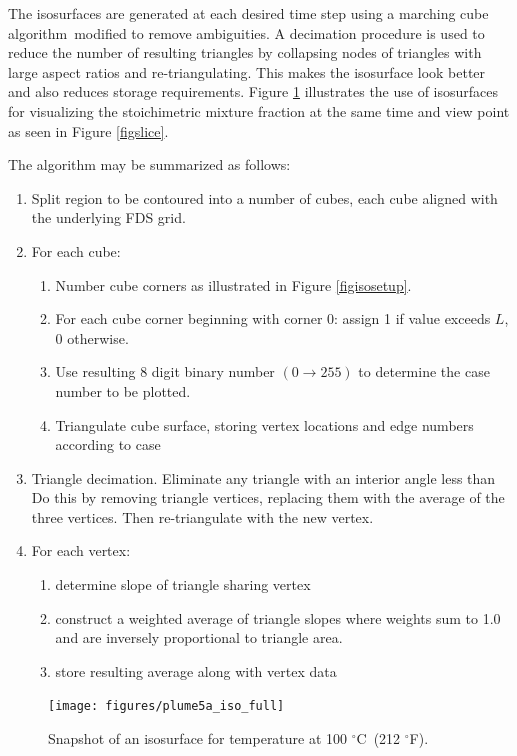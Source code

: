 \documentclass[11pt,twoside]{book}
\newcommand{\degF}{$^\circ$F}
\newcommand{\degC}{$^\circ$C}
\newcommand{\figoptions}{htp}
\begin{document}
The isosurfaces are generated at each desired time step using a
marching cube algorithm\cite{marchingcubes}\ modified to remove
ambiguities. A decimation procedure is used to reduce the number
of resulting triangles by collapsing nodes of triangles with large
aspect ratios and re-triangulating. This makes the isosurface look
better and also reduces storage requirements. Figure \ref{figiso}
illustrates the use of isosurfaces for visualizing the
stoichimetric mixture fraction at the same time and view point as
seen in Figure \ref{figslice}.

The algorithm may be summarized as follows:
\begin{enumerate}
\item Split region to be contoured into a number of cubes, each cube aligned with the underlying FDS grid.
\item For  each cube:
\begin{enumerate}
\item Number cube corners as illustrated in Figure \ref{figisosetup}.
\item For each cube corner beginning with corner 0: assign 1 if value exceeds $L$, 0 otherwise.
\item Use resulting 8 digit binary number $(0\rightarrow 255)$ to determine the case number to be plotted.
\item Triangulate cube surface, storing vertex locations and edge numbers according to case
\end{enumerate}
\item Triangle decimation.  Eliminate any triangle with an interior angle less than     %
Do this by removing triangle vertices, replacing them with the average of the three vertices.  Then re-triangulate with the new vertex.
\item For each vertex:
\begin{enumerate}
\item determine slope of triangle sharing vertex
\item construct a weighted average of triangle slopes where weights sum to 1.0 and are inversely proportional to triangle area.
\item store resulting average along with vertex data
\end{enumerate}
\end{enumerate}

\begin{figure}[\figoptions]
\begin{center}
\texttt{[image: figures/plume5a\_iso\_full]}\\
\end{center}
\caption{Snapshot of an isosurface for temperature at 100 \degC\ (212 \degF).
  }
\label{figiso}%
\end{figure}
\end{document}
